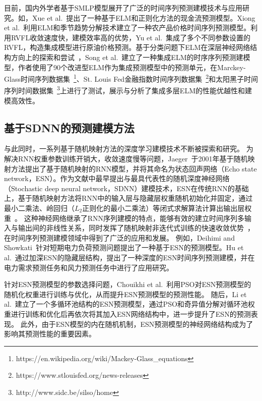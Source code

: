 目前，国内外学者基于SMLP模型展开了广泛的时间序列预测建模技术与应用研究。如，Xue et al.~\cite{xueFinancial2018}提出了一种基于ELM和正则化方法的现金流预测模型。Xiong et al.~\cite{xiongSeasonal2018}利用ELM和季节趋势分解技术建立了一种农产品价格时间序列预测模型。利用RVFL收敛速度快，建模效率高的优势，Yu et al.~\cite{yuInvestigation2020}集成了多个不同参数设置的RVFL，构造集成模型进行原油价格预测。基于分类问题下ELM在深层神经网络结构方向上的探索和尝试~\cite{yuLearning2015,tangExtreme2016}，Song et al.~\cite{songNovel2017}建立了一种集成ELM的时序序列预测建模型，作者使用了90个改进型ELM作为集成预测模型中的预测单元，在Marckey-Glass时间序列数据集~\footnote{https://en.wikipedia.org/wiki/Mackey-Glass\_equations}、St. Louis Fed金融指数时间序列数据集~\footnote{https://www.stlouisfed.org/news-releases}和太阳黑子时间序列时间数据集~\footnote{http://www.sidc.be/silso/home}上进行了测试，展示与分析了集成多层ELM的性能优越性和建模高效性。

\subsection{基于SDNN的预测建模方法}

与此同时，一系列基于随机映射方法的深度学习建模技术不断被探索和研究。
为解决RNN权重参数训练开销大，收敛速度慢等问题，Jaeger~\cite{jaegerEcho2001}于2001年基于随机映射方法提出了基于随机映射的RNN模型，并将其命名为状态回声网络（Echo state network，ESN）。作为文献中最早提出与最具代表性的随机深度神经网络（Stochastic deep neural network，SDNN）建模技术，ESN在传统RNN的基础上，基于随机映射方法将RNN中的输入层与隐藏层权重随机初始化并固定，通过最小二乘法、岭回归（$L_2$正则化的最小二乘法）等闭式求解算法计算出输出层权重~\cite{shen2018duoxishu}。
这种神经网络继承了RNN序列建模的特点，能够有效的建立时间序列多输入与输出间的非线性关系，同时发挥了随机映射非迭代式训练的快速收敛优势~\cite{jaegerAdaptive2002}，在时间序列预测建模领域中得到了广泛的应用和发展。
例如，Deihimi and Showkati~\cite{deihimiApplication2012}针对短期电力负荷预测问题提出了一种基于ESN的预测模型。Hu et al.~\cite{huForecasting2020}通过加深ESN的隐藏层结构，提出了一种深度的ESN时间序列预测建模，并在电力需求预测任务和风力预测任务中进行了应用研究。

针对ESN预测模型的参数选择问题，Chouikhi et al.~\cite{chouikhiPSObased2017}利用PSO对ESN预测模型的随机化权重进行训练与优化，从而提升ESN预测模型的预测性能。
随后，Li et al.~\cite{liPSObased2019}建立了一个多循环池结构的ESN预测模型，通过PSO和奇异值分解对循环池权重进行训练和优化后再依次将其加入ESN网络结构中，进一步提升了ESN的预测表现。
此外，由于ESN模型的内在随机机制，ESN预测模型的神经网络结构成为了影响其预测性能的重要因素。


